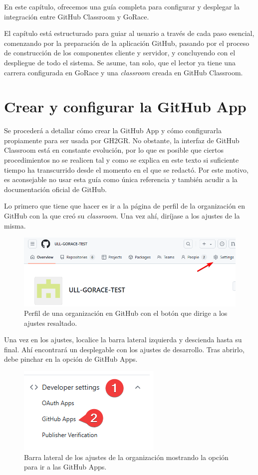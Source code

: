 En este capítulo, ofrecemos una guía completa para configurar y desplegar la integración entre GitHub Classroom y GoRace.

El capítulo está estructurado para guiar al usuario a través de cada paso esencial, comenzando por la preparación de la aplicación GitHub, pasando por el proceso de construcción de los componentes cliente y servidor, y concluyendo con el despliegue de todo el sistema. Se asume, tan solo, que el lector ya tiene una carrera configurada en GoRace y una \textit{classroom} creada en GitHub Classroom.

\section{Crear y configurar la GitHub App} \label{title:create-gh-app}
Se procederá a detallar cómo crear la GitHub App y cómo configurarla propiamente para ser usada por GH2GR. No obstante, la interfaz de GitHub Classroom está en constante evolución, por lo que es posible que ciertos procedimientos no se realicen tal y como se explica en este texto si suficiente tiempo ha transcurrido desde el momento en el que se redactó. Por este motivo, es aconsejable no usar esta guía como única referencia y también acudir a la documentación oficial de GitHub.

Lo primero que tiene que hacer es ir a la página de perfil de la organización en GitHub con la que creó su \textit{classroom}. Una vez ahí, diríjase a los ajustes de la misma.

\begin{figure}[H]
    \centering
    \includegraphics[width=0.5\linewidth]{images/goto-settings.png}
    \caption{Perfil de una organización en GitHub con el botón que dirige a los ajustes resaltado.}
\end{figure}

Una vez en los ajustes, localice la barra lateral izquierda y descienda hasta su final. Ahí encontrará un desplegable con los ajustes de desarrollo. Tras abrirlo, debe pinchar en la opción de GitHub Apps.

\begin{figure}[H]
    \centering
    \includegraphics[width=0.5\linewidth]{images/dev-setting-gapps.png}
    \caption{Barra lateral de los ajustes de la organización mostrando la opción para ir a las GitHub Apps.}
\end{figure}


